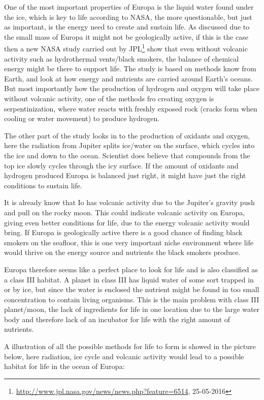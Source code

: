 One of the most important properties of Europa is the liquid water found under the ice, which is key to life according to NASA, the more questionable, but just as important, is the energy need to create and sustain life. As discussed due to the small mass of Europa it might not be geologically active, if this is the case then a new NASA study carried out by JPL\footnote{\url{http://www.jpl.nasa.gov/news/news.php?feature=6514}, 25-05-2016} show that even without volcanic activity such as hydrothermal vents/black smokers, the balance of chemical energy might be there to support life. The study is based on methods know from Earth, and look at how energy and nutrients are carried around Earth's oceans. But most importantly how the production of hydrogen and oxygen will take place without volcanic activity, one of the methods fro creating oxygen is serpentinization, where water reacts with freshly exposed rock (cracks form when cooling or water movement) to produce hydrogen.

The other part of the study looks in to the production of oxidants and oxygen, here the radiation from Jupiter splits ice/water on the surface, which cycles into the ice and down to the ocean. Scientist does believe that compounds from the top ice slowly cycles through the icy surface. If the amount of oxidants and hydrogen produced Europa is balanced just right, it might have just the right conditions to sustain life.

It is already know that Io has volcanic activity due to the Jupiter's gravity push and pull on the rocky moon. This could indicate volcanic activity on Europa, giving even better conditions for life, due to the energy volcanic activity would bring. If Europa is geologically active there is a good chance of finding black smokers on the seafloor, this is one very important niche environment where life would thrive on the energy source and nutrients the black smokers produce.

Europa therefore seems like a perfect place to look for life and is also classified as a class III habitat. A planet in class III has liquid water of some sort trapped in or by ice, but since the water is enclosed the nutrient might be found in too small concentration to contain living organisms. This is the main problem with class III planet/moon, the lack of ingredients for life in one location due to the large water body and therefore lack of an incubator for life with the right amount of nutrients.

A illustration of all the possible methods for life to form is showed in the picture below, here radiation, ice cycle and volcanic activity would lead to a possible habitat for life in the ocean of Europa:

